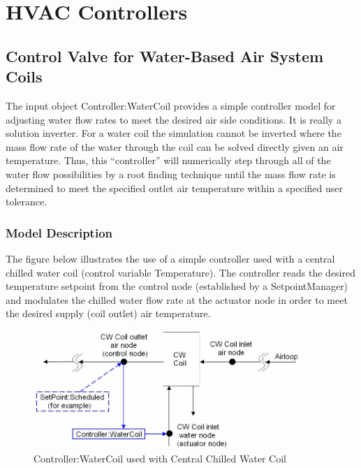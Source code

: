 \section{HVAC Controllers }\label{hvac-controllers}

\subsection{Control Valve for Water-Based Air System Coils}\label{control-valve-for-water-based-air-system-coils}

The input object Controller:WaterCoil provides a simple controller model for adjusting water flow rates to meet the desired air side conditions. It is really a solution inverter. For a water coil the simulation cannot be inverted where the mass flow rate of the water through the coil can be solved directly given an air temperature. Thus, this ``controller'' will numerically step through all of the water flow possibilities by a root finding technique until the mass flow rate is determined to meet the specified outlet air temperature within a specified user tolerance.

\subsubsection{Model Description}\label{model-description-012}

The figure below illustrates the use of a simple controller used with a central chilled water coil (control variable Temperature). The controller reads the desired temperature setpoint from the control node (established by a SetpointManager) and modulates the chilled water flow rate at the actuator node in order to meet the desired supply (coil outlet) air temperature.

\begin{figure}[hbtp]
\centering
\includegraphics[width=0.9\textwidth, height=0.9\textheight, keepaspectratio=true]{media/image4384.png}
\caption{Controller:WaterCoil used with Central Chilled Water Coil \protect \label{fig:controller-watercoil-used-with-central}}
\end{figure}

